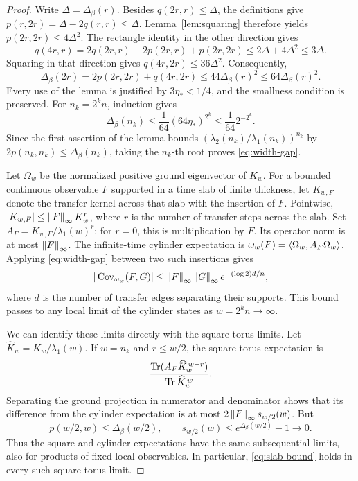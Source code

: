 \begin{proof}
Write \(\Delta=\Delta_\beta(r)\). Besides
\(q(2r,r)\le\Delta\), the definitions give
\(p(r,2r)=\Delta-2q(r,r)\le\Delta\).
Lemma~\ref{lem:squaring} therefore yields
\(p(2r,2r)\le4\Delta^2\). The rectangle identity in the other direction
gives
\[
 q(4r,r)=2q(2r,r)-2p(2r,r)+p(2r,2r)
 \le2\Delta+4\Delta^2\le3\Delta.
\]
Squaring in that direction gives \(q(4r,2r)\le36\Delta^2\). Consequently,
\begin{equation}
 \Delta_\beta(2r)
 =2p(2r,2r)+q(4r,2r)
 \le44\Delta_\beta(r)^2\le64\Delta_\beta(r)^2.
\label{eq:quadratic-recursion}
\end{equation}
Every use of the lemma is justified by \(3\eta_*<1/4\), and the smallness
condition is preserved. For \(n_k=2^kn\), induction gives
\[
 \Delta_\beta(n_k)\le\frac1{64}
          (64\eta_*)^{2^k}\le\frac1{64}2^{-2^k}.
\]
Since the first assertion of the lemma bounds
\((\lambda_2(n_k)/\lambda_1(n_k))^{n_k}\) by
\(2p(n_k,n_k)\le\Delta_\beta(n_k)\), taking the \(n_k\)-th root proves
\eqref{eq:width-gap}.

Let \(\Omega_w\) be the normalized positive ground eigenvector of
\(K_w\). For a bounded continuous observable \(F\) supported in a time slab of finite
thickness, let \(K_{w,F}\) denote the transfer kernel across that slab
with the insertion of \(F\). Pointwise,
\(|K_{w,F}|\le\left\lVert F\right\rVert_\infty K_w^r\), where \(r\) is the number of
transfer steps across the slab. Set \(A_F=K_{w,F}/\lambda_1(w)^r\);
for \(r=0\), this is multiplication by \(F\).
Its operator norm is at most \(\left\lVert F\right\rVert_\infty\). The infinite-time
cylinder expectation is
\(\omega_w(F)=\langle\Omega_w,A_F\Omega_w\rangle\). Applying
\eqref{eq:width-gap} between two such insertions gives
\begin{equation}
 |\operatorname{Cov}_{\omega_w}(F,G)|\le\left\lVert F\right\rVert_\infty\left\lVert G\right\rVert_\infty
                           e^{-(\log2)d/n},
\label{eq:slab-bound}
\end{equation}
where \(d\) is the number of transfer edges separating their supports.
This bound passes to any local limit of the cylinder states as
\(w=2^kn\to\infty\).

We can identify these limits directly with the square-torus limits.
Let \(\widehat K_w=K_w/\lambda_1(w)\). If \(w=n_k\) and \(r\le w/2\), the
square-torus expectation is
\[
 \frac{\operatorname{Tr}(A_F\widehat K_w^{\,w-r})}{\operatorname{Tr}\widehat K_w^{\,w}}.
\]
Separating the ground projection in numerator and denominator shows that
its difference from the cylinder expectation is at most
\(2\left\lVert F\right\rVert_\infty s_{w/2}(w)\). But
\[
 p(w/2,w)\le\Delta_\beta(w/2),\qquad
 s_{w/2}(w)\le e^{\Delta_\beta(w/2)}-1\longrightarrow0.
\]
Thus the square and cylinder expectations have the same subsequential
limits, also for products of fixed local observables. In particular,
\eqref{eq:slab-bound} holds in every such square-torus limit.


\end{proof}
